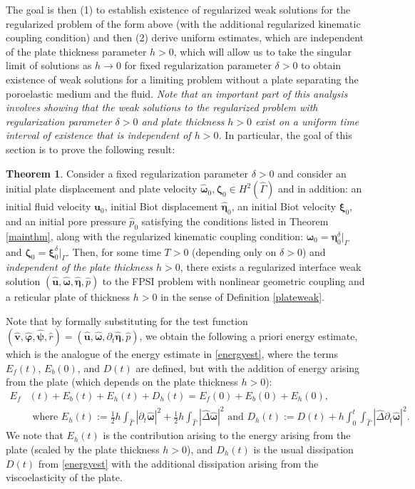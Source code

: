 \documentclass[11pt]{article}
\newcommand{\bd}{\boldsymbol}
\theoremstyle{definition}
\newtheorem{theorem}{Theorem}[section]
\begin{document}
The goal is then (1) to establish existence of regularized weak solutions for the regularized problem of the form above (with the additional regularized kinematic coupling condition) and then (2) derive uniform estimates, which are independent of the plate thickness parameter $h > 0$, which will allow us to take the singular limit of solutions as $h \to 0$ for fixed regularization parameter $\delta > 0$ to obtain existence of weak solutions for a limiting problem without a plate separating the poroelastic medium and the fluid. \textit{Note that an important part of this analysis involves showing that the weak solutions to the regularized problem with regularization parameter $\delta > 0$ and plate thickness $h > 0$ exist on a uniform time interval of existence that is independent of $h > 0$.} In particular, the goal of this section is to prove the following result:

\begin{theorem}\label{hthm}
Consider a fixed regularization parameter $\delta > 0$ and consider an initial plate displacement and plate velocity $\hat{\bd{\omega}}_{0}, \bd{\zeta}_{0} \in H^{2}(\hat{\Gamma})$ and in addition: an initial fluid velocity $\bd{u}_{0}$, initial Biot displacement $\hat{\bd{\eta}}_{0}$, an initial Biot velocity $\bd{\xi}_{0}$, and an initial pore pressure $\hat{p}_{0}$ satisfying the conditions listed in Theorem \ref{mainthm}, along with the regularized kinematic coupling condition: $\bd{\omega}_{0} = \bd{\eta}_{0}^{\delta}|_{\Gamma}$ and $\bd{\zeta}_{0} = \bd{\xi}_{0}^{\delta}|_{\Gamma}$. Then, for some time $T > 0$ (depending only on $\delta > 0$) and \textit{independent of the plate thickness $h > 0$}, there exists a regularized interface weak solution $(\hat{\bd{u}}, \hat{\bd{\omega}}, \hat{\bd{\eta}}, \hat{p})$ to the FPSI problem with nonlinear geometric coupling and a reticular plate of thickness $h > 0$ in the sense of Definition \ref{plateweak}.
\end{theorem}

Note that by formally substituting for the test function $(\hat{\bd{v}}, \hat{\bd{\varphi}}, \hat{\bd{\psi}}, \hat{r}) = (\hat{\bd{u}}, \hat{\bd{\omega}}, \partial_{t} \hat{\bd{\eta}}, \hat{p})$, we obtain the following a priori energy estimate, which is the analogue of the energy estimate in \eqref{energyest}, where the terms $E_{f}(t)$, $E_{b}(0)$, and $D(t)$ are defined, but with the addition of energy arising from the plate (which depends on the plate thickness $h > 0$):
\begin{align*}
E_{f}&(t) + E_{b}(t) + E_{h}(t) + D_{h}(t) = E_{f}(0) + E_{b}(0) + E_{h}(0), \\
&\text{ where } E_{h}(t) := \frac{1}{2} h \int_{\hat{\Gamma}} |\partial_{t} \hat{\bd{\omega}}|^{2} + \frac{1}{2} h \int_{\hat{\Gamma}} |\hat{\Delta} \hat{\bd{\omega}}|^{2} \text{ and } D_{h}(t) := D(t) + h \int_{0}^{t} \int_{\hat{\Gamma}} |\hat{\Delta} \partial_{t}\hat{\bd{\omega}}|^{2}.
\end{align*}
We note that $E_{h}(t)$ is the contribution arising to the energy arising from the plate (scaled by the plate thickness $h > 0$), and $D_{h}(t)$ is the usual dissipation $D(t)$ from \eqref{energyest} with the additional dissipation arising from the viscoelasticity of the plate.
\end{document}
